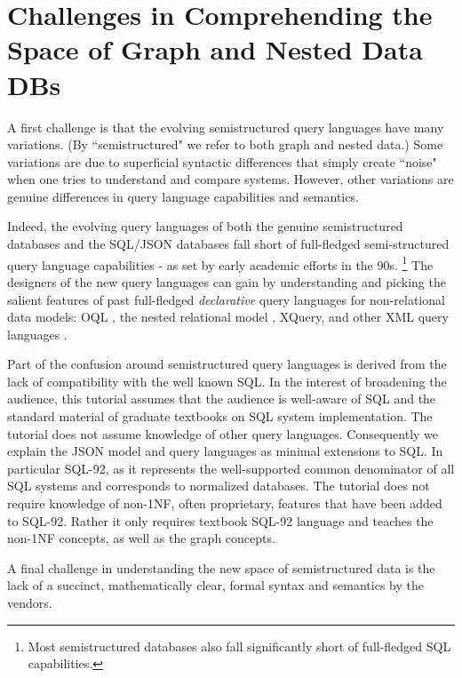 \section{Challenges in Comprehending the Space of Graph and Nested Data DBs}
A first challenge is that the evolving semistructured query languages have many variations. (By ``semistructured" we refer to both graph and nested data.) Some variations are due to superficial syntactic differences that simply create ``noise" when one tries to understand and compare systems. However, other variations are genuine differences in query language capabilities and semantics.

Indeed, the evolving query languages of both the genuine semistructured databases and the SQL/JSON databases fall short of full-fledged semi-structured query language capabilities - as set by early academic efforts in the 90s.%
\footnote{Most semistructured databases also fall significantly short of full-fledged SQL capabilities.}
The designers of the new query languages can gain by understanding and picking the salient features of past full-fledged \textit{declarative} query languages for non-relational data models: OQL \cite{oql-dbpl-1989}, the nested relational model \cite{nest-unnest-pods-1982,nested-relational-vldb-1988,nested-relational-workshop-lncs-1989}, 
XQuery, and other XML query languages \cite{xquery-3.0-w3c-2013,xml-ql-computer-networks-1999,xml-query-language-survey-sigmod-record-2000}.


Part of the confusion around semistructured query languages is derived from the lack of compatibility with the well known SQL. In the interest of broadening the audience, this tutorial assumes that the audience is well-aware of SQL and the standard material of graduate textbooks on SQL system implementation. The tutorial does not assume knowledge of other query languages. Consequently we explain the JSON model and query languages as minimal extensions to SQL. In particular SQL-92, as it represents the well-supported common denominator of all SQL systems and corresponds to normalized databases. The tutorial does not require knowledge of non-1NF, often proprietary, features that have been added to SQL-92. Rather it only requires textbook SQL-92 language and teaches the non-1NF concepts, as well as the graph concepts.

A final challenge in understanding the new space of semistructured data is the lack of a succinct, mathematically clear, formal syntax and semantics by the vendors. 

